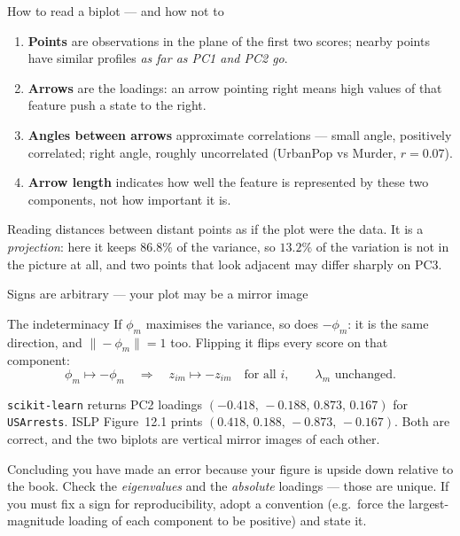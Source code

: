 \documentclass[aspectratio=169,11pt]{beamer}
\begin{document}
\begin{frame}{How to read a biplot --- and how not to}
  \footnotesize
  \begin{readme}
    \begin{enumerate}
      \item \textbf{Points} are observations in the plane of the first two scores; nearby
            points have similar profiles \emph{as far as PC1 and PC2 go}.
      \item \textbf{Arrows} are the loadings: an arrow pointing right means high values of
            that feature push a state to the right.
      \item \textbf{Angles between arrows} approximate correlations --- small angle,
            positively correlated; right angle, roughly uncorrelated (UrbanPop vs Murder,
            $r=0.07$).
      \item \textbf{Arrow length} indicates how well the feature is represented by these
            two components, not how important it is.
    \end{enumerate}
  \end{readme}
  \begin{mistake}
    Reading distances between distant points as if the plot were the data. It is a
    \emph{projection}: here it keeps $86.8\%$ of the variance, so $13.2\%$ of the variation
    is not in the picture at all, and two points that look adjacent may differ sharply on
    PC3.
  \end{mistake}
\end{frame}

\begin{frame}{Signs are arbitrary --- your plot may be a mirror image}
  \footnotesize
  \begin{block}{The indeterminacy}
    If $\phi_m$ maximises the variance, so does $-\phi_m$: it is the same direction, and
    $\|-\phi_m\|=1$ too. Flipping it flips every score on that component:
    \[
      \phi_m \mapsto -\phi_m \quad\Longrightarrow\quad z_{im}\mapsto -z_{im}
      \quad\text{for all } i, \qquad \lambda_m \text{ unchanged.}
    \]
  \end{block}
  \begin{numexample}
    \texttt{scikit-learn} returns PC2 loadings $(-0.418,\,-0.188,\,0.873,\,0.167)$ for
    \texttt{USArrests}. ISLP Figure~12.1 prints $(0.418,\,0.188,\,-0.873,\,-0.167)$.
    Both are correct, and the two biplots are vertical mirror images of each other.
  \end{numexample}
  \begin{mistake}
    Concluding you have made an error because your figure is upside down relative to the
    book. Check the \emph{eigenvalues} and the \emph{absolute} loadings --- those are
    unique. If you must fix a sign for reproducibility, adopt a convention (e.g.\ force the
    largest-magnitude loading of each component to be positive) and state it.
  \end{mistake}
\end{frame}
\end{document}
